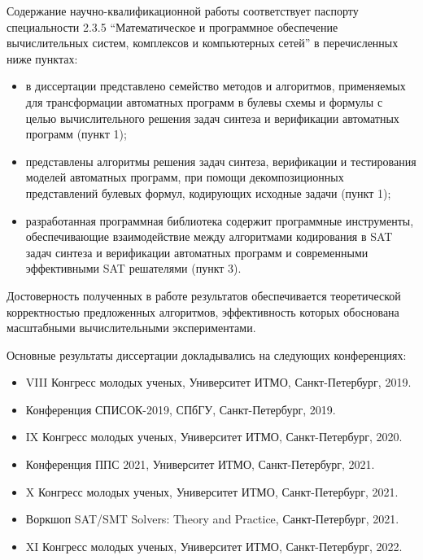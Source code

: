 \relevance
%
Содержание научно-квалификационной работы соответствует паспорту специальности 2.3.5 \enquote{Математическое и программное обеспечение вычислительных систем, комплексов и компьютерных сетей} в перечисленных ниже пунктах:
\begin{itemize}[beginpenalty=10000]
    \item в диссертации представлено семейство методов и алгоритмов, применяемых для трансформации автоматных программ в булевы схемы и формулы с целью вычислительного решения задач синтеза и верификации автоматных программ (пункт 1);
    \item представлены алгоритмы решения задач синтеза, верификации и тестирования моделей автоматных программ, при помощи декомпозиционных представлений булевых формул, кодирующих исходные задачи (пункт 1);
    \item разработанная программная библиотека содержит программные инструменты, обеспечивающие взаимодействие между алгоритмами кодирования в SAT задач синтеза и верификации автоматных программ и современными эффективными SAT решателями (пункт 3).
\end{itemize}


{\reliability}
%
Достоверность полученных в работе результатов обеспечивается теоретической корректностью предложенных алгоритмов, эффективность которых обоснована масштабными вычислительными экспериментами.


\probation
%
Основные результаты диссертации докладывались на следующих конференциях:
\begin{itemize}[beginpenalty=10000]
    \item VIII Конгресс молодых ученых, Университет ИТМО, Санкт-Петербург, 2019.
    \item Конференция СПИСОК-2019, СПбГУ, Санкт-Петербург, 2019.
    \item IX Конгресс молодых ученых, Университет ИТМО, Санкт-Петербург, 2020.
    \item Конференция ППС 2021, Университет ИТМО, Санкт-Петербург, 2021.
    \item X Конгресс молодых ученых, Университет ИТМО, Санкт-Петербург, 2021.
    \item Воркшоп SAT/SMT Solvers: Theory and Practice, Санкт-Петербург, 2021.
    \item XI Конгресс молодых ученых, Университет ИТМО, Санкт-Петербург, 2022.
\end{itemize}

